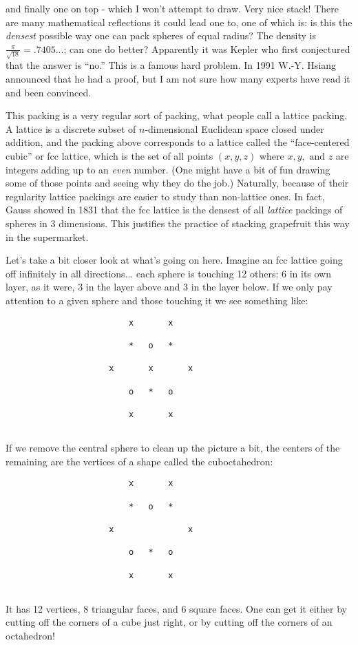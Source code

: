and finally one on top - which I won't attempt to draw. Very nice stack! There are many mathematical reflections it could lead one to, one of which is: is this the \emph{densest} possible way one can pack spheres of equal radius? The density is $\frac{\pi}{\sqrt{18}} = .7405...$; can one do better? Apparently it was Kepler who first conjectured that the answer is ``no.'' This is a famous hard problem. In 1991 W.-Y. Hsiang announced that he had a proof, but I am not sure how many experts have read it and been convinced.

This packing is a very regular sort of packing, what people call a lattice packing. A lattice is a discrete subset of $n$-dimensional Euclidean space closed under addition, and the packing above corresponds to a lattice called the ``face-centered cubic'' or fcc lattice, which is the set of all points $(x,y,z)$ where $x, y,\text{ and }z$ are integers adding up to an \emph{even} number. (One might have a bit of fun drawing some of those points and seeing why they do the job.) Naturally, because of their regularity lattice packings are easier to study than non-lattice ones. In fact, Gauss showed in 1831 that the fcc lattice is the densest of all \emph{lattice} packings of spheres in 3 dimensions. This justifies the practice of stacking grapefruit this way in the supermarket.

Let's take a bit closer look at what's going on here. Imagine an fcc lattice going off infinitely in all directions... each sphere is touching 12 others: 6 in its own layer, as it were, 3 in the layer above and 3 in the layer below. If we only pay attention to a given sphere and those touching it we see something like:
\begin{verbatim}
                         x       x   

                         *   o   * 
 
                     x       x       x

                         o   *   o

                         x       x
                         
\end{verbatim}
If we remove the central sphere to clean up the picture a bit, the centers of the remaining are the vertices of a shape called the cuboctahedron:
\begin{verbatim}
                         x       x   

                         *   o   * 
 
                     x               x

                         o   *   o

                         x       x
                         
\end{verbatim}
It has 12 vertices, 8 triangular faces, and 6 square faces. One can get it either by cutting off the corners of a cube just right, or by cutting off the corners of an octahedron!

